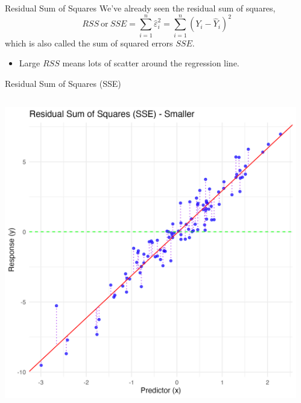 \documentclass{beamer}
\begin{document}
\begin{frame}{Residual Sum of Squares}
    We've already seen the residual sum of squares,
    \begin{equation*}
        RSS\ \textrm{or}\ SSE = \sum_{i=1}^n \hat{\varepsilon}_i^2 = \sum_{i=1}^n (Y_i - \hat{Y}_i)^2
    \end{equation*}
    which is also called the sum of squared errors $SSE$.
    \begin{itemize}
        \item Large $RSS$ means lots of scatter around the regression line.
    \end{itemize}
\end{frame}

\begin{frame}{Residual Sum of Squares (SSE)}
    \begin{columns}
        \begin{column}{0.5\linewidth}
            \includegraphics[width=\linewidth]{figures/sse.png}
        \end{column}
        \begin{column}{0.5\linewidth}

\end{column}
\end{columns}
\end{frame}
\end{document}
